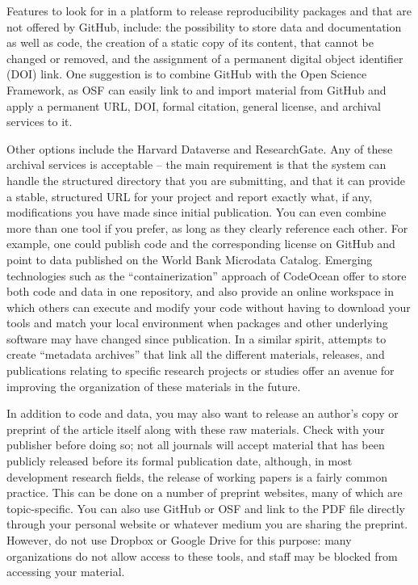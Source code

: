 Features to look for in a platform to release reproducibility packages
and that are not offered by GitHub, include:
the possibility to store data and documentation as well as code,
the creation of a static copy of its content, that cannot be changed or removed,
and the assignment of a permanent digital object identifier (DOI) link.
One suggestion is to combine GitHub with the Open Science Framework,
as OSF can easily link to and import material from GitHub and
apply a permanent URL, DOI, formal citation, general license, and archival services to it.

Other options include the Harvard Dataverse
and ResearchGate.
Any of these archival services is acceptable --
the main requirement is that the system can handle
the structured directory that you are submitting,
and that it can provide a stable, structured URL for your project
and report exactly what, if any,
modifications you have made since initial publication.
You can even combine more than one tool if you prefer,
as long as they clearly reference each other.
For example, one could publish code and the corresponding license on GitHub
and point to data published on the World Bank Microdata Catalog.
Emerging technologies such as the ``containerization'' approach of CodeOcean
offer to store both code and data in one repository,
and also provide an online workspace in which others can execute and modify your code
without having to download your tools and match your local environment
when packages and other underlying software may have changed since publication.
In a similar spirit, attempts to create ``metadata archives''
that link all the different materials, releases, and publications
relating to specific research projects or studies
offer an avenue for improving the organization of these materials in the future.

In addition to code and data,
you may also want to release an author's copy or preprint
of the article itself along with these raw materials.
Check with your publisher before doing so;
not all journals will accept material that has been publicly released
before its formal publication date, although,
in most development research fields,
the release of working papers is a fairly common practice.
This can be done on a number of preprint websites,
many of which are topic-specific.
You can also use GitHub or OSF and link to the PDF file directly
through your personal website or whatever medium you are sharing the preprint.
However, do not use Dropbox or Google Drive for this purpose:
many organizations do not allow access to these tools,
and staff may be blocked from accessing your material.
